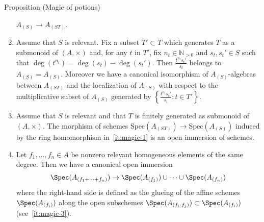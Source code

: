 \documentclass[9pt]{beamer}
\begin{document}
\begin{frame}
\begin{block}{Proposition (Magic of potions)}
\begin{enumerate}
$A_{(S )} \to  A_{(ST )}$.
\item 
\label{it:magic-2}
Assume that $S$ is relevant. Fix a subset $T' \subset T$ which generates $T$ as a submonoid of $(A,\times)$ and, for any $t $ in $T'$, fix $n_t \in \mathbb{N}_{>0}$ and $s_t, s_t' \in \underline{S}$ such that $\deg(t^{n_t}) = \deg(s_t)-\deg(s_t')$.
Then $\frac{t^{n_t} s_t'} { s_t}$ belongs to $A_{(\underline{S} )}=A_{(S)}$. 
 Moreover we have a canonical isomorphism of $A_{(S )}$-algebras between $ A_{(ST )}$ and the localization of $A_{(S )}$ with respect to the multiplicative subset of $A_{(S)}$ generated by $\left\{\frac{t^{n_t} s_t'} { s_t} : t \in T' \right\}$.
\item 
\label{it:magic-3}
Assume that $S$ is relevant and that $T$ is finitely generated as submonoid of $(A,\times)$. The morphism of schemes 
$
\mathrm{Spec} (A_{(ST )}) \to \mathrm{Spec} (A_{(S)})
$
induced by the ring homomorphism in~\eqref{it:magic-1} is an open immersion of schemes.
\item 
\label{it:magic-4}
Let $f_1, \ldots, f_n \in A$ be nonzero relevant homogeneous elements of the same degree.
Then we have a canonical open immersion
\[
\Spec(A_{ (f_1 + \cdots + f_n) }) \to \Spec (A_{(f_1)}) \cup \cdots \cup \Spec (A_{(f_n)})
\]
where the right-hand side is defined as the glueing of the affine schemes $\Spec (A_{(f_i)})$ along the open subschemes $\Spec (A_{(f_i \cdot f_j)}) \subset \Spec (A_{(f_i)})$ (see~\eqref{it:magic-3}).

\end{enumerate}
\end{block}
\end{frame}
\end{document}
